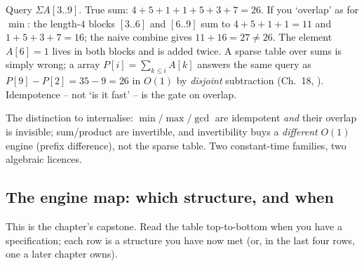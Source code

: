 \begin{warningbox}
Query \(\Sigma A[3..9]\).  True sum: \(4+5+1+1+5+3+7=26\).  If you `overlap' as for \(\min\): the length-\(4\) blocks \([3..6]\) and \([6..9]\) sum to \(4+5+1+1=11\) and \(1+5+3+7=16\); the naive combine gives \(11+16=27\ne26\).  The element \(A[6]=1\) lives in both blocks and is added twice.  A sparse table over sums is simply wrong; a  array \(P[i]=\sum_{k\le i}A[k]\) answers the same query as \(P[9]-P[2]=35-9=26\) in \(O(1)\) by \emph{disjoint} subtraction (Ch.~18, ).  Idempotence -- not `is it fast' -- is the gate on overlap.
\end{warningbox}

\noindent The distinction to internalise: \(\min/\max/\gcd\) are idempotent \emph{and} their overlap is invisible; sum/product are invertible, and invertibility buys a \emph{different} \(O(1)\) engine (prefix difference), not the sparse table. Two constant-time families, two algebraic licences.

\subsection{The engine map: which structure, and when}

This is the chapter's capstone. Read the table top-to-bottom when you have a specification; each row is a structure you have now met (or, in the last four rows, one a later chapter owns).

